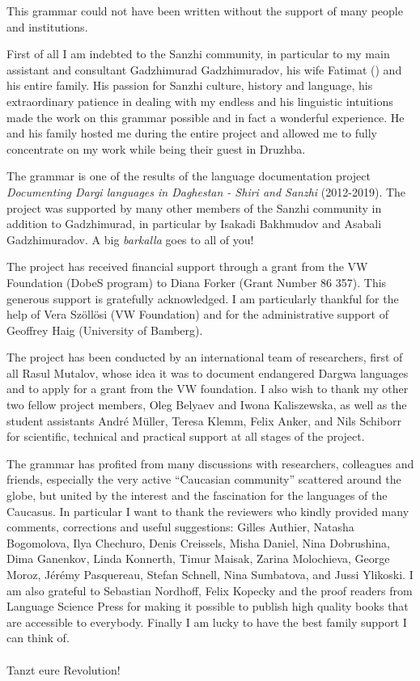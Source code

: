 

This grammar could not have been written without the support of many people and institutions.

First of all I am indebted to the Sanzhi community, in particular to my main assistant and consultant Gadzhimurad Gadzhimuradov, his wife Fatimat () and his entire family. His passion for Sanzhi culture, history and language, his extraordinary patience in dealing with my endless  and his linguistic intuitions made the work on this grammar possible and in fact a wonderful experience. He and his family hosted me during the entire project and allowed me to fully concentrate on my work while being their guest in Druzhba.

The grammar is one of the results of the language documentation project \textit{Documenting Dargi languages in Daghestan - Shiri and Sanzhi} (2012-2019). The project was supported by many other members of the Sanzhi community in addition to Gadzhimurad, in particular by Isakadi Bakhmudov and Asabali Gadzhimuradov. A big \textit{barkalla} goes to all of you!

The project has received financial support through a grant from the VW Foundation (DobeS program) to Diana Forker (Grant Number 86 357). This generous support is gratefully acknowledged. I am particularly thankful for the help of Vera Szöllösi (VW Foundation) and for the administrative support of Geoffrey Haig (University of Bamberg).

The project has been conducted by an international team of researchers, first of all Rasul Mutalov, whose idea it was to document endangered Dargwa languages and to apply for a grant from the VW foundation. I also wish to thank my other two fellow project members, Oleg Belyaev and Iwona Kaliszewska, as well as the student assistants André Müller, Teresa Klemm, Felix Anker, and Nils Schiborr for scientific, technical and practical support at all stages of the project.

The grammar has profited from many discussions with researchers, colleagues and friends, especially the very active ``Caucasian community'' scattered around the globe, but united by the interest and the fascination for the languages of the Caucasus. In particular I want to thank the reviewers who kindly provided many comments, corrections and useful suggestions: Gilles Authier, Natasha Bogomolova, Ilya Chechuro, Denis Creissels, Misha Daniel, Nina Dobrushina, Dima Ganenkov, Linda Konnerth, Timur Maisak, Zarina Molochieva, George Moroz, Jérémy Pasquereau, Stefan Schnell, Nina Sumbatova, and Jussi Ylikoski. I am also grateful to Sebastian Nordhoff, Felix Kopecky and the proof readers from Language Science Press for making it possible to publish high quality books that are accessible to everybody. Finally I am lucky to have the best family support I can think of.
\\\\
Tanzt eure Revolution!



 



